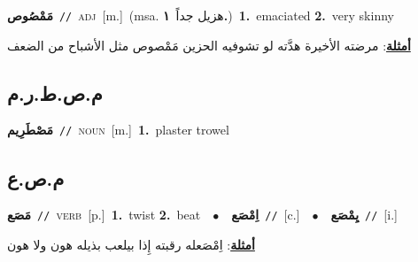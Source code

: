 \documentclass[10pt,a4paper,twoside]{article} %
\begin{document}
\begin{multicols}{2}
{\setlength\topsep{0pt}\textbf{\foreignlanguage{arabic}{مَمْصُوص}}\ {\color{gray}\texttt{//}\color{black}}\ \textsc{adj}\ [m.]\ \color{gray}(msa. \foreignlanguage{arabic}{هزيل جداً}~\foreignlanguage{arabic}{\textbf{١.}})\color{black}\ \textbf{1.}~emaciated  \textbf{2.}~very skinny\  \begin{flushright}\color{gray}\foreignlanguage{arabic}{\textbf{\underline{\foreignlanguage{arabic}{أمثلة}}}: مرضته الأخيرة هدَّته لو تشوفيه الحزين مَمْصوص مثل الأشباح من الضعف}\end{flushright}\color{black}} \vspace{2mm}

\vspace{-3mm}
\subsection*{\color{blue}\foreignlanguage{arabic}{م.ص.ط.ر.م}\color{blue}{ (ntws)}} 

{\setlength\topsep{0pt}\textbf{\foreignlanguage{arabic}{مَصْطَرِيم}}\ {\color{gray}\texttt{//}\color{black}}\ \textsc{noun}\ [m.]\ \textbf{1.}~plaster trowel\ } \vspace{2mm}

\vspace{-3mm}
\subsection*{\color{blue}\foreignlanguage{arabic}{م.ص.ع}\color{blue}{}} 

{\setlength\topsep{0pt}\textbf{\foreignlanguage{arabic}{مَصَع}}\ {\color{gray}\texttt{//}\color{black}}\ \textsc{verb}\ [p.]\ \textbf{1.}~twist  \textbf{2.}~beat\ \ $\bullet$\ \ \setlength\topsep{0pt}\textbf{\foreignlanguage{arabic}{اِمْصَع}}\ {\color{gray}\texttt{//}\color{black}}\ [c.]\ \ $\bullet$\ \ \setlength\topsep{0pt}\textbf{\foreignlanguage{arabic}{يِمْصَع}}\ {\color{gray}\texttt{//}\color{black}}\ [i.]\  \begin{flushright}\color{gray}\foreignlanguage{arabic}{\textbf{\underline{\foreignlanguage{arabic}{أمثلة}}}: اِمْصَعله رقبته إِذا بيلعب بذيله هون ولا هون}\end{flushright}\color{black}} \vspace{2mm}


\end{multicols}
\end{document}
